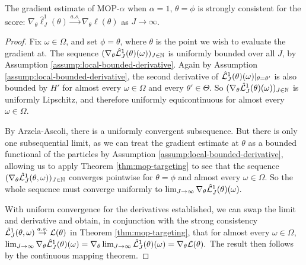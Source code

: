 \documentclass[9pt,twocolumn,twoside]{pnas-new}
\begin{document}
\begin{thm}
    The gradient estimate of MOP-$\alpha$ when $\alpha=1$, $\theta=\phi$ is strongly consistent for the score: $\nabla_\theta \hat\ell_J^1(\theta) \stackrel{a.s.}{\to} \nabla_\theta \ell(\theta)$ as $J \to \infty$.
    \label{thm:mop-grad-consistency}
\end{thm}
\begin{proof}
    Fix $\omega \in \Omega$, and set $\phi = \theta$, where $\theta$ is the point we wish to evaluate the gradient at. The sequence $(\nabla_\theta \hat{\mathcal{L}}_J^1(\theta)(\omega))_{J \in \mathbb{N}}$ is uniformly bounded over all $J$, by Assumption \ref{assump:local-bounded-derivative}. Again by Assumption \ref{assump:local-bounded-derivative}, the second derivative of $\hat{\mathcal{L}}_J^1(\theta)(\omega)|_{\theta=\theta'}$ is also bounded by $H'$ for almost every $\omega\in \Omega$ and every $\theta'\in \Theta$. So $(\nabla_\theta \hat{\mathcal{L}}_J^1(\theta)( \omega))_{J \in \mathbb{N}}$ is uniformly Lipschitz, and therefore uniformly equicontinuous for almost every $\omega \in \Omega$.

    By Arzela-Ascoli, there is a uniformly convergent subsequence. But there is only one subsequential limit, as we can treat the gradient estimate at $\theta$ as a bounded functional of the particles by Assumption \ref{assump:local-bounded-derivative}, allowing us to apply Theorem \ref{thm:mop-targeting} to see that the sequence $(\nabla_\theta \hat{\mathcal{L}}_J^1(\theta, \omega))_{J \in \mathbb{N}}$ converges pointwise for $\theta=\phi$ and almost every $\omega \in \Omega$. So the whole sequence must converge uniformly to $\lim_{J \to \infty} \nabla_\theta \hat{\mathcal{L}}_J^1(\theta)(\omega).$ 
    
    With uniform convergence for the derivatives established, we can swap the limit and derivative and obtain, in conjunction with the strong consistency $\hat{\mathcal{L}}_J^1(\theta, \omega) \stackrel{a.s.}{\to} \mathcal{L}(\theta)$ in Theorem \ref{thm:mop-targeting}, that for almost every $\omega \in \Omega$, 
    $\lim_{J \to \infty} \nabla_\theta \hat{\mathcal{L}}_J^1(\theta)(\omega) = \nabla_\theta \lim_{J \to \infty} \hat{\mathcal{L}}_J^1(\theta)(\omega) = \nabla_\theta \mathcal{L}(\theta).$
    The result then follows by the continuous mapping theorem. 
\end{proof}
\end{document}
